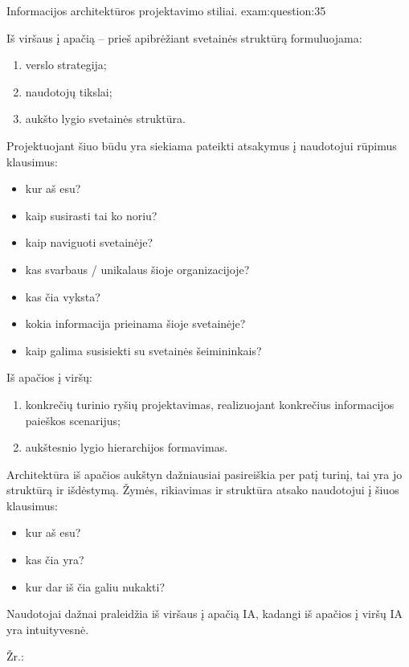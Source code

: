 \begin{question}{%
  Informacijos architektūros projektavimo stiliai.
  }{exam:question:35}

  Iš viršaus į apačią – prieš apibrėžiant svetainės struktūrą formuluojama:
  \begin{enumerate}
    \item verslo strategija;
    \item naudotojų tikslai;
    \item aukšto lygio svetainės struktūra.
  \end{enumerate}
  Projektuojant šiuo būdu yra siekiama pateikti atsakymus į naudotojui
  rūpimus klausimus:
  \begin{itemize}
    \item kur aš esu?
    \item kaip susirasti tai ko noriu?
    \item kaip naviguoti svetainėje?
    \item kas svarbaus / unikalaus šioje organizacijoje?
    \item kas čia vyksta?
    \item kokia informacija prieinama šioje svetainėje?
    \item kaip galima susisiekti su svetainės šeimininkais?
  \end{itemize}

  Iš apačios į viršų:
  \begin{enumerate}
    \item konkrečių turinio ryšių projektavimas, realizuojant konkrečius
      informacijos paieškos scenarijus;
    \item aukštesnio lygio hierarchijos formavimas.
  \end{enumerate}
  Architektūra iš apačios aukštyn dažniausiai pasireiškia per patį
  turinį, tai yra jo struktūrą ir išdėstymą. Žymės, rikiavimas ir
  struktūra atsako naudotojui į šiuos klausimus:
  \begin{itemize}
    \item kur aš esu?
    \item kas čia yra?
    \item kur dar iš čia galiu nukakti?
  \end{itemize}
  Naudotojai dažnai praleidžia iš viršaus į apačią IA, kadangi iš
  apačios į viršų IA yra intuityvesnė.

  Žr.: \cite[23]{skaidres-14}
\end{question}

